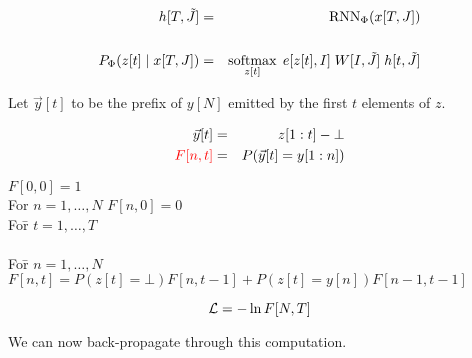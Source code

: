 {\begin{eqnarray*}
  h[T,\tilde{J}] & = & \mathrm{RNN}_\Phi(x[T,J]) \\
  \\
  P_\Phi(z[t]\;|\;x[T,J]) & = & \operatorname*{softmax}_{z[t]} \;e[z[t],I]\;W[I,\tilde{J}]\;h[t,\tilde{J}]
\end{eqnarray*}


Let $\vec{y}[t]$ to be the prefix of $y[N]$ emitted by the first $t$ elements of $z$.

\begin{eqnarray*}
  \vec{y}[t] & = & z[1:t] -\bot \\
  {\color{red} F[n,t]} & = & P(\vec{y}[t] = y[1:n])
\end{eqnarray*}

\vfill
\begin{tabbing}
  {\color{red} $F[0,0] = 1$} \\
  For $n = 1,\ldots,N$ {\color{red} $F[n,0] = 0$} \\
  Fo\=r $t = 1,\dots,T$ \\
       \\
      \> Fo\=r $n = 1,\ldots, N$ \\
      \>     \> {\color{red} $F[n,t] = P(z[t] = \bot) F[n,t-1] + P(z[t] = y[n])F[n-1,t-1]$}
\end{tabbing}


{\color{red} $${\cal L} = - \ln F[N,T]$$}

We can now back-propagate through this computation.

}


